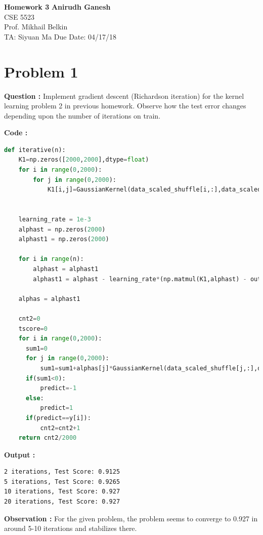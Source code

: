 \documentclass[a4paper, 11pt]{article}
\begin{document}
\noindent
\large\textbf{Homework 3} \hfill \textbf{Anirudh Ganesh} \\
\normalsize CSE 5523  \\
Prof. Mikhail Belkin \\
TA: Siyuan Ma \hfill Due Date: 04/17/18

\section*{Problem 1}

\textbf{Question :} Implement gradient descent (Richardson iteration) for the kernel learning problem 2 in previous homework. Observe how the test error changes depending upon the number of iterations on train.


\textbf{Code :}

\begin{lstlisting}[language=Python]
def iterative(n):
    K1=np.zeros([2000,2000],dtype=float)
    for i in range(0,2000):
        for j in range(0,2000):
            K1[i,j]=GaussianKernel(data_scaled_shuffle[i,:],data_scaled_shuffle[j,:],final_sigma2)


    learning_rate = 1e-3
    alphast = np.zeros(2000)
    alphast1 = np.zeros(2000)

    for i in range(n):
        alphast = alphast1
        alphast1 = alphast - learning_rate*(np.matmul(K1,alphast) - output_shuffle)

    alphas = alphast1

    cnt2=0
    tscore=0             
    for i in range(0,2000):
      sum1=0
      for j in range(0,2000):
          sum1=sum1+alphas[j]*GaussianKernel(data_scaled_shuffle[j,:],data_test_scaled[i,:],final_sigma2)
      if(sum1<0):
          predict=-1
      else:
          predict=1
      if(predict==y[i]):
          cnt2=cnt2+1
    return cnt2/2000

\end{lstlisting}

\textbf{Output :}
\begin{verbatim}
2 iterations, Test Score: 0.9125
5 iterations, Test Score: 0.9265
10 iterations, Test Score: 0.927
20 iterations, Test Score: 0.927
\end{verbatim}

\textbf{Observation :} For the given problem, the problem seems to converge to 0.927 in around 5-10 iterations and stabilizes there.

\clearpage
\end{document}
